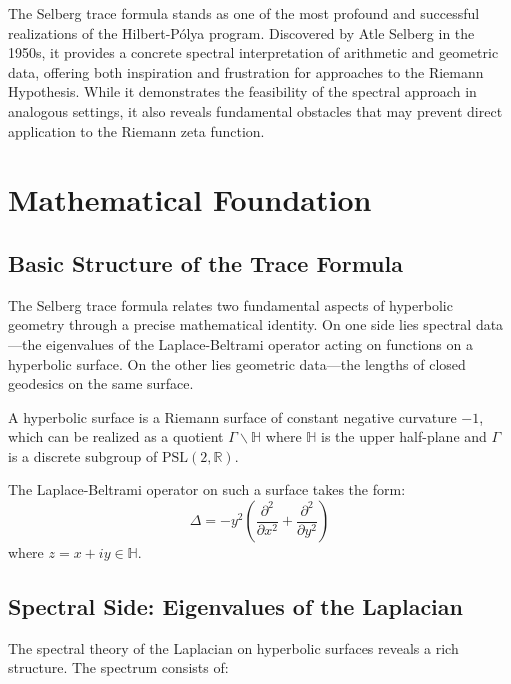 \label{ch:selberg_trace}

The Selberg trace formula stands as one of the most profound and successful realizations of the Hilbert-Pólya program. Discovered by Atle Selberg in the 1950s, it provides a concrete spectral interpretation of arithmetic and geometric data, offering both inspiration and frustration for approaches to the Riemann Hypothesis. While it demonstrates the feasibility of the spectral approach in analogous settings, it also reveals fundamental obstacles that may prevent direct application to the Riemann zeta function.

\section{Mathematical Foundation}
\label{sec:mathematical_foundation}

\subsection{Basic Structure of the Trace Formula}

The Selberg trace formula relates two fundamental aspects of hyperbolic geometry through a precise mathematical identity. On one side lies spectral data—the eigenvalues of the Laplace-Beltrami operator acting on functions on a hyperbolic surface. On the other lies geometric data—the lengths of closed geodesics on the same surface.

\begin{definition}
\label{def:hyperbolic_surface}
A hyperbolic surface is a Riemann surface of constant negative curvature $-1$, which can be realized as a quotient $\Gamma \backslash \mathbb{H}$ where $\mathbb{H}$ is the upper half-plane and $\Gamma$ is a discrete subgroup of $\mathrm{PSL}(2,\mathbb{R})$.
\end{definition}

The Laplace-Beltrami operator on such a surface takes the form:
$$\Delta = -y^2 \left( \frac{\partial^2}{\partial x^2} + \frac{\partial^2}{\partial y^2} \right)$$
where $z = x + iy \in \mathbb{H}$.

\subsection{Spectral Side: Eigenvalues of the Laplacian}

The spectral theory of the Laplacian on hyperbolic surfaces reveals a rich structure. The spectrum consists of:

